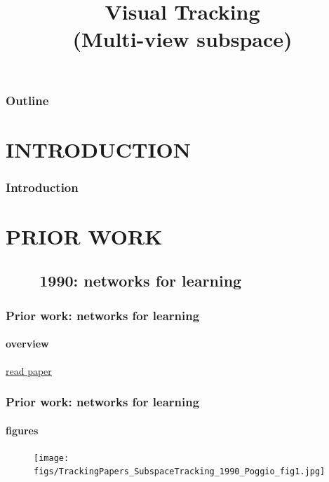 
\title{Visual Tracking \\ (Multi-view subspace)}
\begin{frame}[plain]\logoTechTower
	\titlepage
\end{frame}

\begin{frame}
\frametitle{Outline}
\logoCSIPCPL\logoTechTower
	\setcounter{tocdepth}{1}	
	\tableofcontents
\end{frame}

\section{INTRODUCTION}
\begin{frame}
\frametitle{Introduction}
\framesubtitle{}
\logoCSIPCPL\mypagenum
\end{frame}

\section{PRIOR WORK}
\subsection{\ \ \ \ 1990: networks for learning}
\begin{frame}
\frametitle{Prior work: networks for learning}
\framesubtitle{overview}
\mypagenum
	{\color{blue}  \href{http://users.ece.gatech.edu/~msalman/papers/1990 JNL, Networks for Approximation and Learning (Poggio).pdf}{read paper}}
\end{frame}


\begin{frame}
\frametitle{Prior work: networks for learning}
\framesubtitle{figures}
\mypagenum
	\begin{figure}
		\texttt{[image: figs/TrackingPapers\_SubspaceTracking\_1990\_Poggio\_fig1.jpg]}
	\end{figure}
\end{frame}


